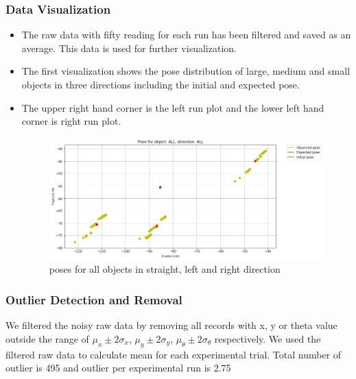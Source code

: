 \documentclass[10pt,a4paper]{article}
\begin{document}
						 \subsubsection{Data Visualization}
						\begin{itemize}
							\item The raw data with fifty reading for each run has been filtered and saved as an average. This data is used for further visualization. 
							\item The first visualization shows the pose distribution of large, medium and small objects in three directions including the initial and expected pose. 
							\item The upper right hand corner is the left run plot and the lower left hand corner is right run plot.
							\begin{figure}[h]
								\centering
								\includegraphics[width=1.0\linewidth]{img/pose_all_all.png}
								\caption{poses for all objects in straight, left and right direction}
								\label{fig:poses for all objects in straight, left and right direction}
							\end{figure}
					\end{itemize}			
	    				 \subsubsection{Outlier Detection and Removal}
		    				 We filtered the noisy raw data by removing all records with x, y or theta value outside the range of $\mu_x \pm 2\sigma_x$, $\mu_y \pm 2\sigma_y$, $\mu_\theta \pm 2\sigma_\theta$ respectively. We used the filtered raw data to calculate mean for each experimental trial. Total number of outlier is 495 and outlier per experimental run is 2.75
\end{document}
